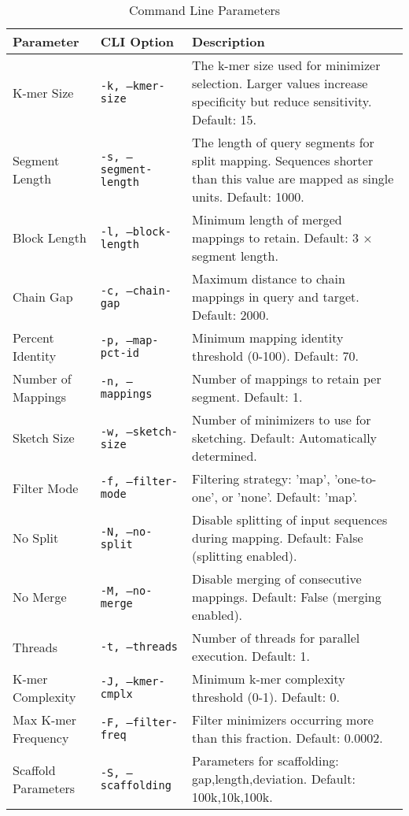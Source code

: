 \documentclass{article}
\begin{document}
\begin{table}[htbp]
\centering
\begin{tabular}{@{}llp{8cm}@{}}
\toprule
\textbf{Parameter} & \textbf{CLI Option} & \textbf{Description} \\
\midrule
K-mer Size & \texttt{-k, --kmer-size} & The k-mer size used for minimizer selection. Larger values increase specificity but reduce sensitivity. Default: 15. \\
\addlinespace
Segment Length & \texttt{-s, --segment-length} & The length of query segments for split mapping. Sequences shorter than this value are mapped as single units. Default: 1000. \\
\addlinespace
Block Length & \texttt{-l, --block-length} & Minimum length of merged mappings to retain. Default: 3 × segment length. \\
\addlinespace
Chain Gap & \texttt{-c, --chain-gap} & Maximum distance to chain mappings in query and target. Default: 2000. \\
\addlinespace
Percent Identity & \texttt{-p, --map-pct-id} & Minimum mapping identity threshold (0-100). Default: 70. \\
\addlinespace
Number of Mappings & \texttt{-n, --mappings} & Number of mappings to retain per segment. Default: 1. \\
\addlinespace
Sketch Size & \texttt{-w, --sketch-size} & Number of minimizers to use for sketching. Default: Automatically determined. \\
\addlinespace
Filter Mode & \texttt{-f, --filter-mode} & Filtering strategy: 'map', 'one-to-one', or 'none'. Default: 'map'. \\
\addlinespace
No Split & \texttt{-N, --no-split} & Disable splitting of input sequences during mapping. Default: False (splitting enabled). \\
\addlinespace
No Merge & \texttt{-M, --no-merge} & Disable merging of consecutive mappings. Default: False (merging enabled). \\
\addlinespace
Threads & \texttt{-t, --threads} & Number of threads for parallel execution. Default: 1. \\
\addlinespace
K-mer Complexity & \texttt{-J, --kmer-cmplx} & Minimum k-mer complexity threshold (0-1). Default: 0. \\
\addlinespace
Max K-mer Frequency & \texttt{-F, --filter-freq} & Filter minimizers occurring more than this fraction. Default: 0.0002. \\
\addlinespace
Scaffold Parameters & \texttt{-S, --scaffolding} & Parameters for scaffolding: gap,length,deviation. Default: 100k,10k,100k. \\
\bottomrule
\end{tabular}
\caption{Command Line Parameters}
\label{tab:cli-params}
\end{table}
\end{document}
